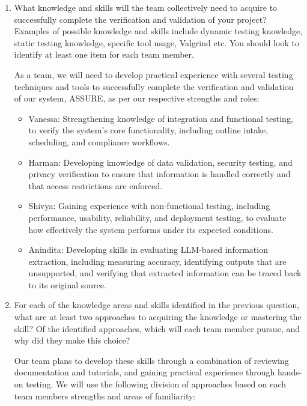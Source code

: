 \documentclass[12pt, titlepage]{article}
\begin{document}
\begin{enumerate}
  \item What knowledge and skills will the team collectively need to acquire to
  successfully complete the verification and validation of your project?
  Examples of possible knowledge and skills include dynamic testing knowledge,
  static testing knowledge, specific tool usage, Valgrind etc.  You should look to
  identify at least one item for each team member.

As a team, we will need to develop practical experience with several testing techniques and tools to successfully complete the verification and validation of our system, ASSURE, as per our respective strengths and roles:
\begin{itemize}
  \item Vanessa: Strengthening knowledge of integration and functional testing, to verify the system's core functionality, including outline intake, scheduling, and compliance workflows.
  \item Harman: Developing knowledge of data validation, security testing, and privacy verification to ensure that information is handled correctly and that access restrictions are enforced.
  \item Shivya: Gaining experience with non-functional testing, including performance, usability, reliability, and deployment testing, to evaluate how effectively the system performs under its expected conditions.
  \item Anindita: Developing skills in evaluating LLM-based information extraction, including measuring accuracy, identifying outputs that are unsupported, and verifying that extracted information can be traced back to its original source.
\end{itemize}

  \item For each of the knowledge areas and skills identified in the previous
  question, what are at least two approaches to acquiring the knowledge or
  mastering the skill?  Of the identified approaches, which will each team
  member pursue, and why did they make this choice?

Our team plans to develop these skills through a combination of reviewing documentation and tutorials, and gaining practical experience through hands-on testing. We will use the following division of approaches based on each team members strengths and areas of familiarity:


\end{enumerate}
\end{document}
